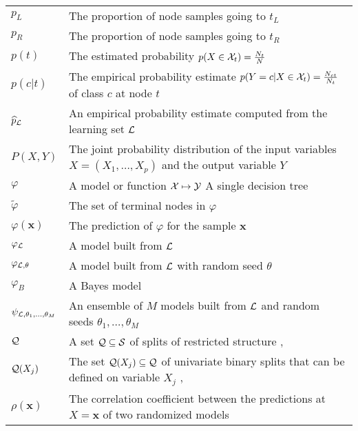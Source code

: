 \begin{tabularx}{\textwidth}{ l X }
$p_L$ & The proportion of node samples going to $t_L$ \dotfill  \pageref{ntn:p_L}\\
$p_R$ & The proportion of node samples going to $t_R$ \dotfill  \pageref{ntn:p_R}\\
$p(t)$ & The estimated probability $p(X \in {\cal X}_t)=\tfrac{N_t}{N}$ \dotfill  \pageref{ntn:p_t}\\
$p(c|t)$ & The empirical probability estimate $p(Y=c | X \in {\cal X}_t)=\tfrac{N_{ct}}{N_t}$ of class $c$ at node $t$ \dotfill  \pageref{ntn:p_ct}\\
$\widehat{p}_{\cal L}$ & An empirical probability estimate computed from the learning set ${\cal L}$\dotfill  \pageref{eqn:4:proba-estimates}\\
$P(X,Y)$ & The joint probability distribution of the input variables $X=(X_1,\dots,X_p)$ and the output variable $Y$ \dotfill  \pageref{ntn:P_XY}\\
$\varphi$ & A model or function ${\cal X} \mapsto {\cal Y}$ \dotfill  \pageref{ntn:varphi}\newline A single decision tree \dotfill  \pageref{ntn:tree}\\
$\widetilde{\varphi}$ & The set of terminal nodes in $\varphi$ \dotfill  \pageref{ntn:varphi-leafs}\\
$\varphi(\mathbf{x})$ & The prediction of $\varphi$ for the sample $\mathbf{x}$ \dotfill  \pageref{ntn:varphi-x}\\
$\varphi_{\cal L}$ & A model built from ${\cal L}$ \dotfill  \pageref{ntn:varphi-L}\\
$\varphi_{{\cal L},\theta}$ & A model built from ${\cal L}$ with random seed $\theta$ \dotfill  \pageref{ntn:varphi-Ltheta}\\
$\varphi_B$ & A Bayes model \dotfill  \pageref{ntn:varphi-B}\\
$\psi_{{\cal L},\theta_1,\dots,\theta_M}$ & An ensemble of $M$ models built from ${\cal L}$ and random seeds $\theta_1, \dots, \theta_M$ \dotfill \pageref{ntn:psi} \\
${\cal Q}$ & A set ${\cal Q} \subseteq {\cal S}$ of splits of restricted structure \dotfill \pageref{ntn:Q}, \pageref{ntn:Q2}\\
${\cal Q}(X_j)$ & The set ${\cal Q}(X_j) \subseteq {\cal Q}$ of univariate binary splits that can be defined on variable $X_j$ \dotfill \pageref{eqn:q:ordered}, \pageref{eqn:q:categorical-cart}\\
$\rho(\mathbf{x})$ & The correlation coefficient between the predictions at $X=\mathbf{x}$ of two randomized models \dotfill \pageref{eqn:4:correlation} \\

\end{tabularx}
